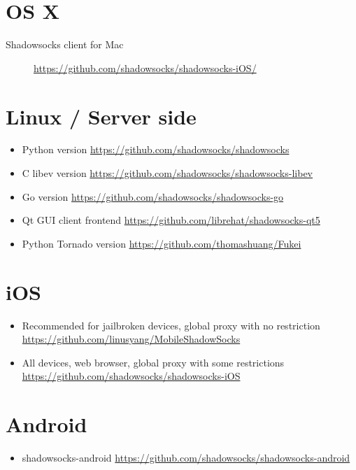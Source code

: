 \documentclass[11pt,a4paper]{sphinxmanual}
\begin{document}
\section{OS X}
\label{sec-3-2}
\begin{description}
\item[{Shadowsocks client for Mac}] \href{https://github.com/shadowsocks/shadowsocks-iOS/}{\url{https://github.com/shadowsocks/shadowsocks-iOS/}}
\end{description}

\section{Linux / Server side}
\label{sec-3-3}
\begin{itemize}
\item Python version  \href{https://github.com/shadowsocks/shadowsocks}{\url{https://github.com/shadowsocks/shadowsocks}}
\item C libev version  \href{https://github.com/shadowsocks/shadowsocks-libev}{\url{https://github.com/shadowsocks/shadowsocks-libev}}
\item Go version  \href{https://github.com/shadowsocks/shadowsocks-go}{\url{https://github.com/shadowsocks/shadowsocks-go}}
\item Qt GUI client frontend  \href{https://github.com/librehat/shadowsocks-qt5}{\url{https://github.com/librehat/shadowsocks-qt5}}
\item Python Tornado version  \href{https://github.com/thomashuang/Fukei}{\url{https://github.com/thomashuang/Fukei}}
\end{itemize}

\section{iOS}
\label{sec-3-4}
\begin{itemize}
\item Recommended for jailbroken devices, global proxy with no restriction \href{https://github.com/linusyang/MobileShadowSocks}{\url{https://github.com/linusyang/MobileShadowSocks}}
\item All devices, web browser, global proxy with some restrictions \href{https://github.com/shadowsocks/shadowsocks-iOS}{\url{https://github.com/shadowsocks/shadowsocks-iOS}}
\end{itemize}

\section{Android}
\label{sec-3-5}
\begin{itemize}
\item shadowsocks-android \href{https://github.com/shadowsocks/shadowsocks-android}{\url{https://github.com/shadowsocks/shadowsocks-android}}
\end{itemize}
\end{document}
